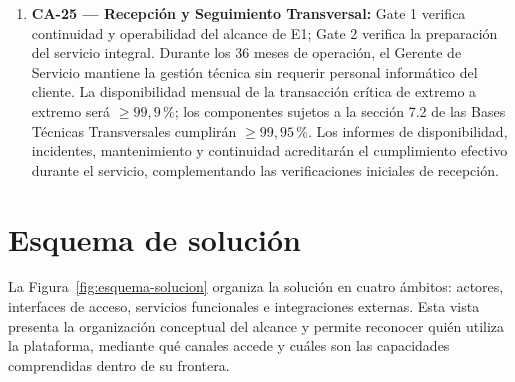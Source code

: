 \begin{enumerate}
\begin{itemize}
        \item \emph{CA-20 (Boyas):} Gate 1 verifica para las 40 boyas quién ocupa cada una, el estado del tren de fondeo y su última inspección; Gate 2 verifica la continuidad del registro integrado. La prueba combinará consulta operacional, historial y una jornada de inspección con ocho horas sin cobertura, seguida de sincronización.

        \item \emph{CA-21 (Facturación):} Gate 2 verifica el proceso sin cuadernos, su conciliación y el registro de notas de crédito por error. Como metas adicionales, el esfuerzo de preparación se reducirá de diez a dos días-persona mensuales y las notas de crédito por error a menos del 1\,\%. Se medirán el esfuerzo administrativo y la proporción de documentos corregidos en los cierres observados.

        \item \emph{CA-22 (Abandono):} Gate 2 verifica los 14 expedientes completos, digitalizados, indexados y foliados en PDF/A. Se cotejará cada expediente con sus fuentes migradas, conservando el inventario y la trazabilidad probatoria.
    \end{itemize}

    \item \textbf{CA-25 --- Recepción y Seguimiento Transversal:}
    Gate 1 verifica continuidad y operabilidad del alcance de E1; Gate 2 verifica la preparación del servicio integral. Durante los 36 meses de operación, el Gerente de Servicio mantiene la gestión técnica sin requerir personal informático del cliente. La disponibilidad mensual de la transacción crítica de extremo a extremo será $\ge 99,9\,\%$; los componentes sujetos a la sección 7.2 de las Bases Técnicas Transversales cumplirán $\ge 99,95\,\%$. Los informes de disponibilidad, incidentes, mantenimiento y continuidad acreditarán el cumplimiento efectivo durante el servicio, complementando las verificaciones iniciales de recepción.
\end{enumerate}

\newpage
\section{Esquema de solución}

La Figura~\ref{fig:esquema-solucion} organiza la solución en cuatro
ámbitos: actores, interfaces de acceso, servicios funcionales e
integraciones externas. Esta vista presenta la organización conceptual del alcance y permite reconocer quién utiliza la plataforma, mediante qué canales accede y cuáles son las capacidades comprendidas dentro de su frontera.

